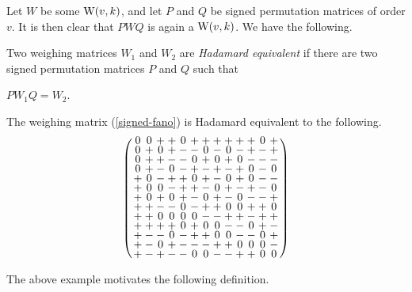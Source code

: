 \documentclass[../../../main]{subfiles}
\begin{document}
 Let $W$ be some $\text{W}(v,k)$, and let $P$ and $Q$ be signed permutation matrices of order $v$. It is then clear that $PWQ$ is again a $\text{W}(v,k)$. We have the following.
 
 \begin{defin}
 Two weighing matrices $W_1$ and $W_2$ are {\it Hadamard equivalent} if there are two signed permutation matrices $P$ and $Q$ such that 
 \begin{defenum}
 \item\label{ternary-equiv} $PW_1Q=W_2$.
 \end{defenum}
 \end{defin}
 
 \begin{ex}
  The weighing matrix (\ref{signed-fano}) is Hadamard equivalent to the following.
  \begin{equation}
  \arraycolsep=1.25pt\def\arraystretch{0.625}
   \left(\begin{array}{ccccccccccccc}
0&0&+&+&0&+&+&+&+&+&+&0&+\\
0&+&0&+&-&-&0&-&0&-&+&-&+\\
0&+&+&-&-&0&+&0&+&0&-&-&-\\
0&+&-&0&-&+&-&+&-&+&0&-&0\\
+&0&-&+&+&0&+&-&0&+&0&-&-\\
+&0&0&-&+&+&-&0&+&-&+&-&0\\
+&0&+&0&+&-&0&+&-&0&-&-&+\\
+&+&-&-&0&-&+&+&0&0&+&+&0\\
+&+&0&0&0&0&-&-&+&+&-&+&+\\
+&+&+&+&0&+&0&0&-&-&0&+&-\\
+&-&-&0&-&+&+&0&0&-&-&0&+\\
+&-&0&+&-&-&-&+&+&0&0&0&-\\
+&-&+&-&-&0&0&-&-&+&+&0&0\\
   \end{array}\right)
  \end{equation}
 \end{ex}
 
 The above example motivates the following definition.
 
\end{document}
